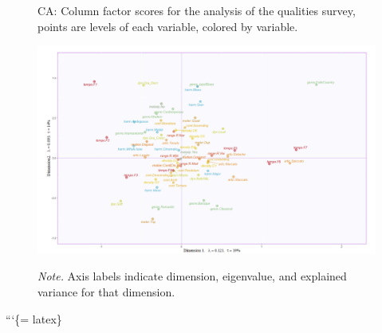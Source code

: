 \documentclass[
]{article}
\begin{document}
\begin{figure}   
  \centering  
  \caption{CA: Column factor scores for the analysis of the qualities survey, points are levels of each variable, colored by variable.}
    \includegraphics{./supmatsimgs/qfactormapsjall.png}
  \label{fig:qjmapsall}
  \caption*{\footnotesize \textit{Note.} Axis labels indicate dimension, eigenvalue, and explained variance for that dimension.}
\end{figure}

```\{= latex\}
\end{document}
